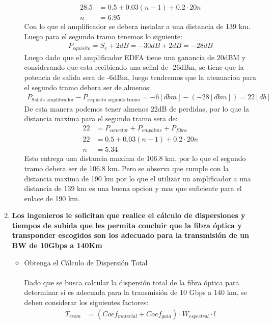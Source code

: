 \begin{enumerate}
\begin{itemize}
\begin{align}
			28.5 &= 0.5 + 0.03(n-1) + 0.2 \cdot 20n\\
			n&= 6.95
		\end{align}
		Con lo que el amplificador se debera instalar a una distancia de 139 km. Luego para el segundo tramo tenemos lo siguiente:
		\begin{align}
			P_{equisito} = S_{e} + 2dB = -30dB + 2dB = -28dB
		\end{align}
		Luego dado que el amplificador EDFA tiene una ganancia de 20dBM y considerando que esta recibiendo una señal de -26dBm, se tiene que la potencia de salida sera de -6dBm, luego tendremos que la atenuacion para el segundo tramo debera ser de almenos:
		\begin{align}
			P_{\text{Salida amplificador}} - P_{\text{requisito segundo tramo}}= -6[dbm] -(-28[dbm]) = 22[db]
		\end{align}
		De esta manera podemos tener almenos 22dB de perdidas, por lo que la distancia maxima para el segundo tramo sera de:
		\begin{align}
			22 &= P_{conector} + P_{empalme} + P_{fibra}\\
			22 &= 0.5 + 0.03(n-1) + 0.2 \cdot 20n\\
			n&=5.34
		\end{align}
		Esto entrega una distancia maxima de 106.8 km, por lo que el segundo tramo debera ser de 106.8 km. Pero se observa que cumple con la distancia maxima de 190 km por lo que el utilizar un amplificador a una distancia de 139 km es una buena opcion y mas que suficiente para el enlace de 190 km.
	\end{itemize}
	\item \textbf{Los ingenieros le solicitan que realice el cálculo de dispersiones y tiempos de subida que les permita concluir que la fibra óptica y transponder escogidos son los adecuado para la transmisión de un BW de 10Gbps a 140Km}
		\begin{itemize}
			\item Obtenga el Cálculo de Dispersión Total\\\\
			Dado que se busca calcular la dispersión total de la fibra óptica para determinar si es adecuada para la transmisión de 10 Gbps a 140 km, se deben considerar los siguientes factores:
			\begin{align}
				T_{crom} &= (Coef_{material} + Coef_{guia}) \cdot W_{espectral} \cdot l\\

\end{align}
\end{itemize}
\end{enumerate}
